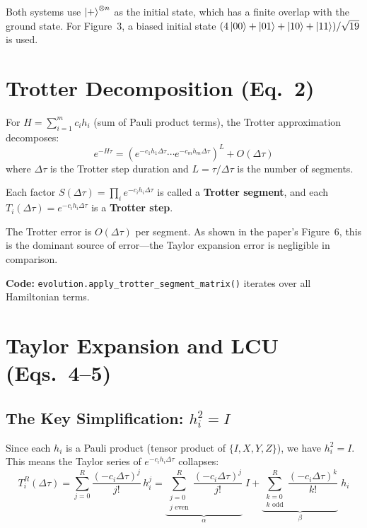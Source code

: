 \documentclass[11pt,a4paper]{article}
\begin{document}
Both systems use $\ket{+}^{\otimes n}$ as the initial state, which has a finite overlap with the ground state. For Figure~3, a biased initial state $(4\ket{00} + \ket{01} + \ket{10} + \ket{11})/\sqrt{19}$ is used.


\section{Trotter Decomposition (Eq.~2)}

For $H = \sum_{i=1}^{m} c_i h_i$ (sum of Pauli product terms), the Trotter approximation decomposes:
\begin{equation}
  e^{-H\tau} = \left(e^{-c_1 h_1 \Delta\tau} \cdots e^{-c_m h_m \Delta\tau}\right)^{L} + O(\Delta\tau)
  \label{eq:trotter}
\end{equation}
where $\Delta\tau$ is the Trotter step duration and $L = \tau/\Delta\tau$ is the number of segments.

Each factor $S(\Delta\tau) = \prod_i e^{-c_i h_i \Delta\tau}$ is called a \textbf{Trotter segment}, and each $T_i(\Delta\tau) = e^{-c_i h_i \Delta\tau}$ is a \textbf{Trotter step}.

The Trotter error is $O(\Delta\tau)$ per segment. As shown in the paper's Figure~6, this is the dominant source of error---the Taylor expansion error is negligible in comparison.

\noindent\textbf{Code:} \texttt{evolution.apply\_trotter\_segment\_matrix()} iterates over all Hamiltonian terms.


\section{Taylor Expansion and LCU (Eqs.~4--5)}

\subsection{The Key Simplification: $h_i^2 = I$}

Since each $h_i$ is a Pauli product (tensor product of $\{I, X, Y, Z\}$), we have $h_i^2 = I$. This means the Taylor series of $e^{-c_i h_i \Delta\tau}$ collapses:
\begin{equation}
  T_i^R(\Delta\tau) = \sum_{j=0}^{R} \frac{(-c_i \Delta\tau)^j}{j!}\, h_i^j
  = \underbrace{\sum_{\substack{j=0\\j\text{ even}}}^{R} \frac{(-c_i \Delta\tau)^j}{j!}}_{\alpha}\; I
  + \underbrace{\sum_{\substack{k=0\\k\text{ odd}}}^{R} \frac{(-c_i \Delta\tau)^k}{k!}}_{\beta}\; h_i
  \label{eq:taylor}
\end{equation}
\end{document}
